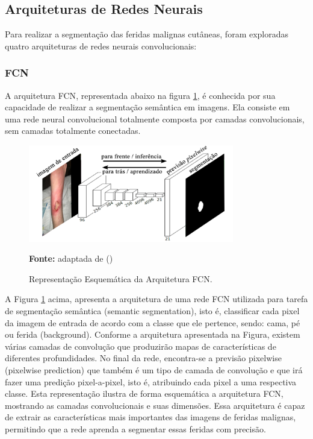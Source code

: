 \subsection{Arquiteturas de Redes Neurais}
    Para realizar a segmentação das feridas malignas cutâneas, foram exploradas quatro arquiteturas de redes neurais convolucionais:

    \subsubsection{FCN}
    
        A arquitetura \ac{FCN}, representada abaixo na figura \ref{fig:arquiteturaFCN},  é conhecida por sua capacidade de realizar a segmentação semântica em imagens. Ela consiste em uma rede neural convolucional totalmente composta por camadas convolucionais, sem camadas totalmente conectadas. 

        \begin{figure}[htbp]
            \centering
            \caption{Representação Esquemática da Arquitetura \ac{FCN}.}
            \includegraphics[width=0.8\textwidth]{img/arquitetura_FCN.png}
            \label{fig:arquiteturaFCN}
            \par\medskip\textbf{Fonte:} adaptada de (\cite{long2015fully})
        \end{figure}
        
        \clearpage
        
        A Figura \ref{fig:arquiteturaFCN} acima, apresenta a arquitetura de uma rede \ac{FCN} utilizada para tarefa de segmentação semântica (semantic segmentation), isto é, classificar cada pixel da imagem de entrada de acordo com a classe que ele pertence, sendo: cama, pé ou ferida (background). Conforme a arquitetura apresentada na Figura, existem várias camadas de convolução que produzirão mapas de características de diferentes profundidades. No final da rede, encontra-se a previsão pixelwise (pixelwise prediction) que também é um tipo de camada de convolução e que irá fazer uma predição pixel-a-pixel, isto é, atribuindo cada pixel a uma respectiva classe. Esta representação ilustra de forma esquemática a arquitetura \ac{FCN}, mostrando as camadas convolucionais e suas dimensões. Essa arquitetura é capaz de extrair as características mais importantes das imagens de feridas malignas, permitindo que a rede aprenda a segmentar essas feridas com precisão. 



